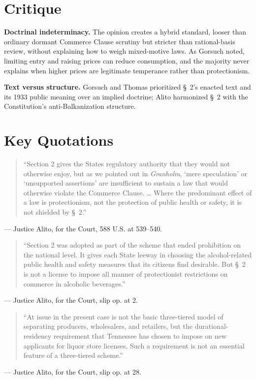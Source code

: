 \documentclass[12pt]{article}
\begin{document}
\section{Critique}

\textbf{Doctrinal indeterminacy.} The opinion creates a hybrid standard, looser than ordinary dormant Commerce Clause scrutiny but stricter than rational-basis review, without explaining how to weigh mixed-motive laws. As Gorsuch noted, limiting entry and raising prices can reduce consumption, and the majority never explains when higher prices are legitimate temperance rather than protectionism.

\textbf{Text versus structure.} Gorsuch and Thomas prioritized \S~2's enacted text and its 1933 public meaning over an implied doctrine; Alito harmonized \S~2 with the Constitution's anti-Balkanization structure.

\section{Key Quotations}

\begin{quote}
``Section 2 gives the States regulatory authority that they would not otherwise enjoy, but as we pointed out in \textit{Granholm}, `mere speculation' or `unsupported assertions' are insufficient to sustain a law that would otherwise violate the Commerce Clause. \ldots{} Where the predominant effect of a law is protectionism, not the protection of public health or safety, it is not shielded by \S~2.''
\end{quote}
\noindent --- Justice Alito, for the Court, 588 U.S. at 539--540.

\begin{quote}
``Section 2 was adopted as part of the scheme that ended prohibition on the national level. It gives each State leeway in choosing the alcohol-related public health and safety measures that its citizens find desirable. But \S~2 is not a license to impose all manner of protectionist restrictions on commerce in alcoholic beverages.''
\end{quote}
\noindent --- Justice Alito, for the Court, slip op. at 2.

\begin{quote}
``At issue in the present case is not the basic three-tiered model of separating producers, wholesalers, and retailers, but the durational-residency requirement that Tennessee has chosen to impose on new applicants for liquor store licenses. Such a requirement is not an essential feature of a three-tiered scheme.''
\end{quote}
\noindent --- Justice Alito, for the Court, slip op. at 28.
\end{document}
